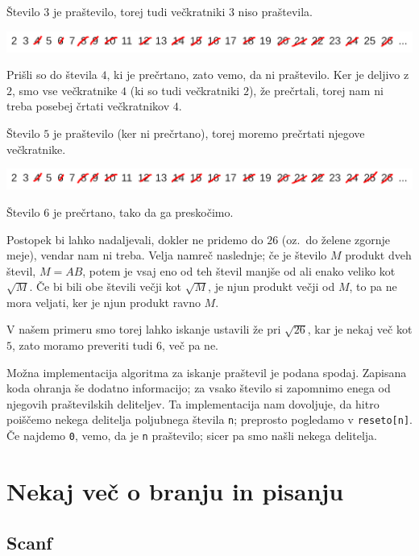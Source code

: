 \documentclass{book}
\begin{document}
Število $3$ je praštevilo, torej tudi večkratniki $3$ niso praštevila.

\includegraphics[width=\linewidth]{chapters/teorija-stevil/slike/reseto3}

Prišli so do števila $4$, ki je prečrtano, zato vemo, da ni praštevilo.
Ker je deljivo z $2$, smo vse večkratnike $4$ (ki so tudi večkratniki $2$), že
prečrtali, torej nam ni treba posebej črtati večkratnikov $4$.

Število $5$ je praštevilo (ker ni prečrtano), torej moremo prečrtati njegove
večkratnike.

\includegraphics[width=\linewidth]{chapters/teorija-stevil/slike/reseto4}

Število $6$ je prečrtano, tako da ga preskočimo.

Postopek bi lahko nadaljevali, dokler ne pridemo do $26$ (oz.~do želene zgornje
meje), vendar nam ni treba.
Velja namreč naslednje; če je število $M$ produkt dveh števil, $M = A B$, potem
je vsaj eno od teh števil manjše od ali enako veliko kot $\sqrt{M}$.
Če bi bili obe števili večji kot $\sqrt{M}$, je njun produkt večji od $M$, to pa
ne mora veljati, ker je njun produkt ravno $M$.

V našem primeru smo torej lahko iskanje ustavili že pri $\sqrt{26}$, kar je
nekaj več kot $5$, zato moramo preveriti tudi $6$, več pa ne.

\begin{examples}
  Možna implementacija algoritma za iskanje praštevil je podana spodaj.
  Zapisana koda ohranja še dodatno informacijo; za vsako število si zapomnimo
  enega od njegovih praštevilskih deliteljev.
  Ta implementacija nam dovoljuje, da hitro poiščemo nekega delitelja poljubnega
  števila \verb+n+; preprosto pogledamo v \verb+reseto[n]+.
  Če najdemo \verb+0+, vemo, da je \verb+n+ praštevilo; sicer pa smo našli
  nekega delitelja.
\end{examples}

\chapter{Nekaj več o branju in pisanju}

\section{Scanf}
\end{document}
